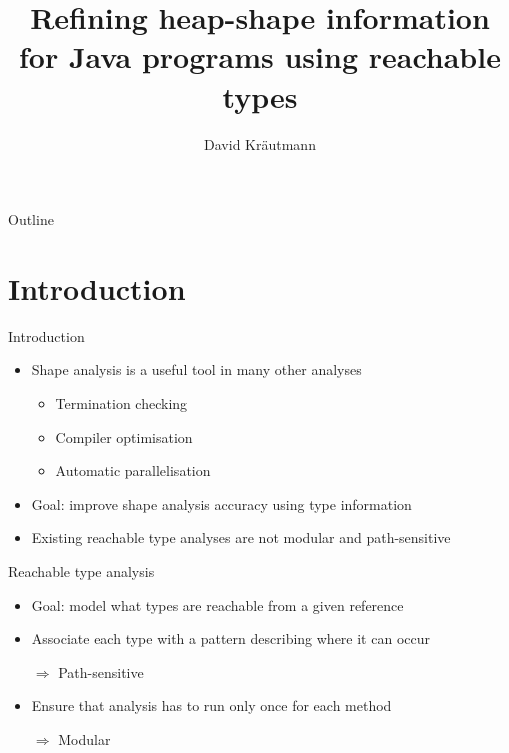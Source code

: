 \documentclass{beamer}
\title{Refining heap-shape information for Java programs using reachable types}
\author{David Kr\"{a}utmann}
\institute{RWTH Aachen}
\begin{document}
\begin{frame} \titlepage \end{frame}

\begin{frame}{Outline} \tableofcontents \end{frame}

\section{Introduction}
\begin{frame}{Introduction}
\begin{itemize}
    \item Shape analysis is a useful tool in many other analyses
    \begin{itemize}
        \item Termination checking
        \item Compiler optimisation
        \item Automatic parallelisation
    \end{itemize}
    \item Goal: improve shape analysis accuracy using type information
    \item Existing reachable type analyses are not modular and path-sensitive
    
\end{itemize}
\end{frame}
\begin{frame}{Reachable type analysis}
\begin{itemize}
    \item Goal: model what types are reachable from a given reference
    \item Associate each type with a pattern describing where it can occur
    \item[$\Rightarrow$] Path-sensitive
    \item Ensure that analysis has to run only once for each method
    \item[$\Rightarrow$] Modular
\end{itemize}
\end{frame}
\end{document}
